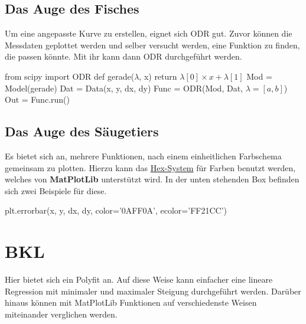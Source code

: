 \documentclass[a4paper,12pt]{article}
\begin{document}
\subsection{Das Auge des Fisches}
Um eine angepasste Kurve zu erstellen, eignet sich ODR gut. Zuvor können die Messdaten geplottet werden und selber versucht werden, eine Funktion zu finden, die passen könnte. Mit ihr kann dann ODR durchgeführt werden.
\begin{center}
\begin{tcolorbox}[colback=gray!20, colframe=black, width=1\textwidth, boxrule=1pt, arc=1mm]
from scipy import ODR \newline
def gerade($\lambda$, x) \newline
\hspace*{1cm} return $\lambda[0] \times x + \lambda[1]$ \newline
Mod = Model(gerade) \newline
Dat = Data(x, y, dx, dy) \newline
Func = ODR(Mod, Dat, $\lambda=[a, b]$) \newline
Out = Func.run()
\end{tcolorbox}
\end{center}

\subsection{Das Auge des Säugetiers}
Es bietet sich an, mehrere Funktionen, nach einem einheitlichen Farbschema gemeinsam zu plotten. Hierzu kann das \href{https://www.rapidtables.org/de/web/color/html-color-codes.html}{Hex-System} für Farben benutzt werden, welches von \textbf{MatPlotLib} unterstützt wird. In der unten stehenden Box befinden sich zwei Beispiele für diese.
\begin{center}
\begin{tcolorbox}[colback=gray!20, colframe=black, width=1\textwidth, boxrule=1pt, arc=1mm]
plt.errorbar(x, y, dx, dy, color='0AFF0A', ecolor='FF21CC')
\end{tcolorbox}
\end{center}

\section{BKL}

\begin{center}
\begin{tcolorbox}[
colback=gray!20,     %
colframe=red,        %
width=0.8\textwidth, %
boxrule=1pt,         %
arc=1mm,             %
]
Hier bietet sich ein Polyfit an. Auf diese Weise kann einfacher eine lineare Regression mit minimaler und maximaler Steigung durchgeführt werden. Darüber hinaus können mit MatPlotLib Funktionen auf verschiedenste Weisen miteinander verglichen werden.
\end{tcolorbox}
\end{center}
\end{document}
